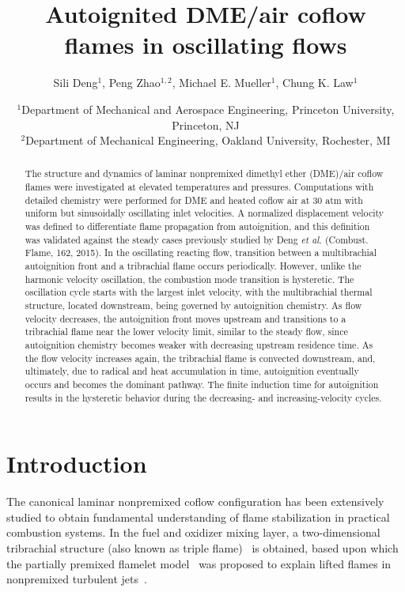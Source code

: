 \documentclass{essci}
\begin{document}
\title{ Autoignited DME/air coflow flames in oscillating flows }
\author{
%
Sili Deng$^1$, Peng Zhao$^{1,2}$, Michael E. Mueller$^1$, Chung K. Law$^1$
%
}
\date{
%
$^1$Department of Mechanical and Aerospace Engineering, Princeton University, Princeton, NJ \\
$^2$Department of Mechanical Engineering, Oakland University, Rochester, MI
%
}
\maketitle

\begin{abstract}
The structure and dynamics of laminar nonpremixed dimethyl ether (DME)/air coflow flames were investigated at elevated temperatures and pressures. Computations with detailed chemistry were performed for DME and heated coflow air at 30 atm with uniform but sinusoidally oscillating inlet velocities. A normalized displacement velocity was defined to differentiate flame propagation from autoignition, and this definition was validated against the steady cases previously studied by Deng \emph{et al.} (Combust. Flame, 162, 2015). In the oscillating reacting flow, transition between a multibrachial autoignition front and a tribrachial flame occurs periodically. However, unlike the harmonic velocity oscillation, the combustion mode transition is hysteretic. The oscillation cycle starts with the largest inlet velocity, with the multibrachial thermal structure, located downstream, being governed by autoignition chemistry. As flow velocity decreases, the autoignition front moves upstream and transitions to a tribrachial flame near the lower velocity limit, similar to the steady flow, since autoignition chemistry becomes weaker with decreasing upstream residence time. As the flow velocity increases again, the tribrachial flame is convected downstream, and, ultimately, due to radical and heat accumulation in time, autoignition eventually occurs and becomes the dominant pathway. The finite induction time for autoignition results in the hysteretic behavior during the decreasing- and increasing-velocity cycles.
\end{abstract}


\section{Introduction}

The canonical laminar nonpremixed coflow configuration has been extensively studied to obtain fundamental understanding of flame stabilization in practical combustion systems.  In the fuel and oxidizer mixing layer, a two-dimensional tribrachial structure (also known as triple flame)~\cite{buckmaster02} is obtained, based upon which the partially premixed flamelet model~\cite{muller94} was proposed to explain lifted flames in nonpremixed turbulent jets~\cite{chung07}.
\end{document}
